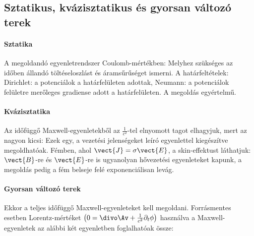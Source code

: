   \subsection{Sztatikus, kvázisztatikus és gyorsan változó terek}\label{ss:01-eldidofugges}
   
   \paragraph{Sztatika}
   
    A megoldandó egyenletrendszer Coulomb-mértékben:
    Melyhez szükséges az időben állandó töltéseloszlást és áramsűrűséget ismerni.
   A határfeltételek: Dirichlet: a potenciálok a határfelületen adottak, Neumann: a potenciálok felületre merőleges gradiense adott a határfelületen.
   A megoldás egyértelmű. 
  
   \paragraph{Kvázisztatika}
    
    Az időfüggő Maxwell-egyenletekből az $\frac{1}{c^2}$-tel elnyomott tagot elhagyjuk, mert az nagyon kicsi:
    Ezek egy, a vezetési jelenségeket leíró egyenlettel kiegészítve megoldhatóak.
   Fémben, ahol $\vect{J}=\sigma\vect{E}$, a skin-effektust láthatjuk: $\vect{B}$-re és $\vect{E}$-re is ugyanolyan hővezetési egyenleteket kapunk, a megoldás pedig a fém belseje felé exponenciálisan levág. 
    
   \paragraph{Gyorsan változó terek}
    
    Ekkor a teljes időfüggő Maxwell-egyenleteket kell megoldani.
   Forrásmentes esetben Lorentz-mértéket $\left(0=\divo \Av+\frac{1}{c^2}\partial_t\phi\right)$ használva a Maxwell-egyenletek az alábbi két egyenletben foglalhatóak össze:
    
